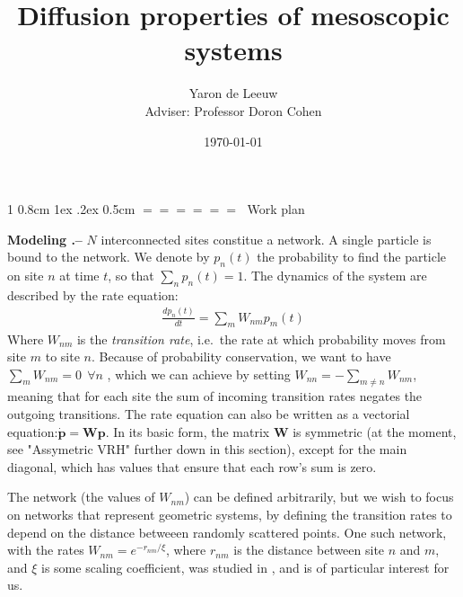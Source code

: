 \documentclass[onecolumn,fleqn,notitlepage,secnumarabic]{revtex4}
\makeatletter
\def\section{%
  \@startsection
    {section}%
    {1}%
    {\z@}%
    {0.8cm \@plus1ex \@minus .2ex}%
    {0.5cm}%
    {\Large\bf $=\!=\!=\!=\!=\!=\;$}%
}%
\makeatother
\begin{document}
\title{Diffusion properties of mesoscopic systems}

\author{Yaron de Leeuw \\ Adviser: Professor Doron Cohen}
\date{\today}
\maketitle


\section{Work plan}


{ \bf Modeling .-- } $N$ interconnected sites constitue a network. A single particle is bound to the network. We denote by $p_n(t)$ the probability to find the particle on site $n$ at time $t$, so that $\sum_n p_n(t) =1$. The dynamics of the system are described by the rate equation:
\begin{align}
\frac{dp_n(t)}{dt} = \sum_m W_{nm}p_m(t)
\end{align}
Where $W_{nm}$ is the \emph{transition rate}, i.e.\ the rate at which probability moves from site $m$ to site $n$.
Because of probability conservation, we want to have $\sum_m W_{nm} = 0 \ \ \forall n$ , which we can achieve by setting $W_{nn} = -\sum_{m\ne n} W_{nm} $, meaning that for each site the sum of incoming transition rates negates the outgoing transitions.
The rate equation can also be written as a vectorial equation:$\boldsymbol{ \dot p } = \boldsymbol{W} \boldsymbol{p}$. In its basic form, the matrix $\boldsymbol{W}$ is symmetric (at the moment, see "Assymetric VRH" further down in this section), except for the main diagonal, which has values that ensure that each row's sum is zero.

The network (the values of $W_{nm}$) can be defined arbitrarily, but we wish to focus on networks that represent geometric systems, by defining the transition rates to depend on the distance betweeen randomly scattered points. One such network, with the rates $W_{nm}= e^{-r_{nm}/ \xi}$, where $r_{nm}$ is the distance between site $n$ and $m$, and $\xi$ is some scaling coefficient, was studied in \cite{Amir:2010:PRL}, and is of particular interest for us.
\end{document}
